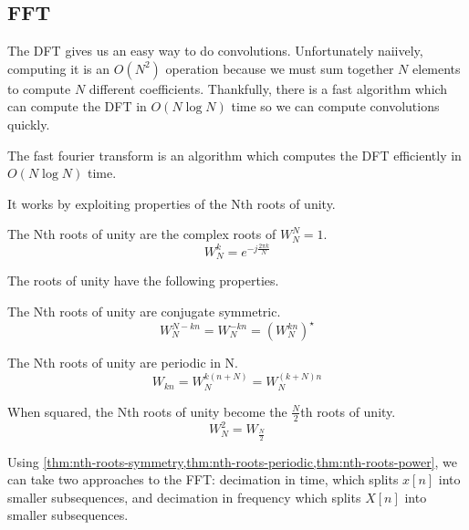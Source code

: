 \subsection{FFT}
The DFT gives us an easy way to do convolutions. Unfortunately naiively, computing it is an $O(N^2)$ operation
because we must sum together $N$ elements to compute $N$ different coefficients.
Thankfully, there is a fast algorithm which can compute the DFT in $O(N\log N)$ time so we can compute convolutions quickly.
\begin{definition}
  The fast fourier transform is an algorithm which computes the DFT efficiently in $O(N\log N)$ time.
  \label{defn:fft}
\end{definition}
It works by exploiting properties of the Nth roots of unity.
\begin{definition}
  The Nth roots of unity are the complex roots of $W_N^N=1$.
  \[
	W_N^k=e^{-j\frac{2\pi k}{N}}
  \]
  \label{defn:nth-roots}
\end{definition}
The roots of unity have the following properties.
\begin{theorem}
  The Nth roots of unity are conjugate symmetric.
  \[
	W_N^{N-kn} = W_N^{-kn} = (W_N^{kn})^\star
  \]
  \label{thm:nth-roots-symmetry}
\end{theorem}
\begin{theorem}
  The Nth roots of unity are periodic in N.
  \[
	W_{kn} = W_N^{k(n+N)} = W_N^{(k+N)n}
  \]
  \label{thm:nth-roots-periodic}
\end{theorem}
\begin{theorem}
  When squared, the Nth roots of unity become the $\frac{N}{2}$th roots of unity.
  \[
	W_N^2 = W_\frac{N}{2}
  \]
  \label{thm:nth-roots-power}
\end{theorem}
Using \cref{thm:nth-roots-symmetry,thm:nth-roots-periodic,thm:nth-roots-power}, we can take two approaches to the FFT: decimation in time, which splits $x[n]$ into smaller subsequences, and decimation in frequency which splits $X[n]$ into smaller subsequences.
